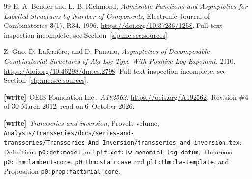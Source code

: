 \documentclass[11pt,letterpaper]{article}
\numberwithin{equation}{section}
\theoremstyle{definition}\newtheorem{definition}[theorem]{Definition}
\theoremstyle{remark}\newtheorem{remark}[theorem]{Remark}
\newcommand{\file}[1]{\nolinkurl{#1}}
\newcommand{\wtag}{\textup{\textbf{[write]}}}
\begin{document}
\begin{thebibliography}{99}
E. A. Bender and L. B. Richmond,
\emph{Admissible Functions and Asymptotics for Labelled Structures
by Number of Components}, Electronic Journal of Combinatorics
\textbf{3}(1), R34, 1996.
\url{https://doi.org/10.37236/1258}.
Full-text inspection incomplete; see Section~\ref{sfp:mc:sec:sources}.

Z. Gao, D. Laferri\`ere, and D. Panario,
\emph{Asymptotics of Decomposable Combinatorial Structures of
Alg-Log Type With Positive Log Exponent}, 2010.
\url{https://doi.org/10.46298/dmtcs.2798}.
Full-text inspection incomplete; see Section~\ref{sfp:mc:sec:sources}.

 \wtag\ OEIS Foundation Inc., \emph{A192562}.
\url{https://oeis.org/A192562}. Revision \#4 of 30 March 2012, read on 6~October 2026.

 \wtag\ \emph{Transseries and inversion}, ProveIt volume,
\file{Analysis/Transseries/docs/series-and-transseries/Transseries_And_Inversion/transseries_and_inversion.tex}:
Definitions \file{p0:def:model} and \file{plt:def:lw-monomial-log-datum}, Theorems \file{p0:thm:lambert-core},
\file{p0:thm:staircase} and \file{plt:thm:lw-template}, and Proposition \file{p0:prop:factorial-core}.

\end{thebibliography}
\end{document}

